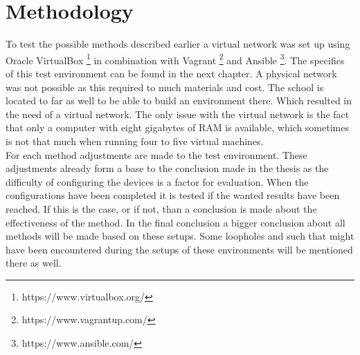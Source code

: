 
\chapter{Methodology}
\label{ch:methodologie}

To test the possible methods described earlier a virtual network was set up using Oracle VirtualBox \footnote{ https://www.virtualbox.org/} in combination with Vagrant \footnote{https://www.vagrantup.com/} and Ansible \footnote{https://www.ansible.com/}. The specifics of this test environment can be found in the next chapter. A physical network was not possible as this required to much materials and cost. The school is located to far as well to be able to build an environment there. Which resulted in the need of a virtual network. The only issue with the virtual network is the fact that only a computer with eight gigabytes of RAM is available, which sometimes is not that much when running four to five virtual machines.\\

For each method adjustments are made to the test environment. These adjustments already form a base to the conclusion made in the thesis as the difficulty of configuring the devices is a factor for evaluation. When the configurations have been completed it is tested if the wanted results have been reached. If this is the case, or if not, than a conclusion is made about the effectiveness of the method. In the final conclusion a bigger conclusion about all methods will be made based on these setups. Some loopholes and such that might have been encountered during the setups of these environments will be mentioned there as well.\\

















